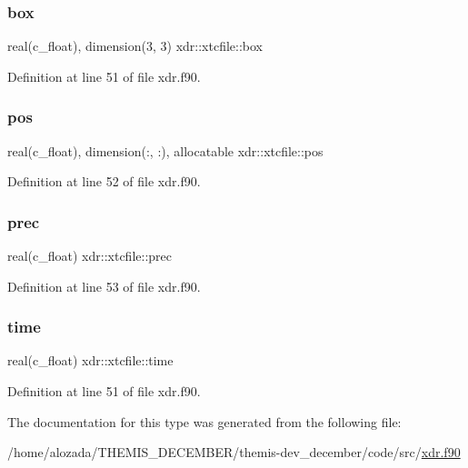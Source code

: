 \subsubsection{\texorpdfstring{box}{box}}
{\footnotesize\ttfamily real(c\+\_\+float), dimension(3, 3) xdr\+::xtcfile\+::box}



Definition at line 51 of file xdr.\+f90.

\mbox{\label{structxdr_1_1xtcfile_abda2627be95e0de9df18e915d53a988a}} 
\subsubsection{\texorpdfstring{pos}{pos}}
{\footnotesize\ttfamily real(c\+\_\+float), dimension(\+:, \+:), allocatable xdr\+::xtcfile\+::pos}



Definition at line 52 of file xdr.\+f90.

\mbox{\label{structxdr_1_1xtcfile_aac421da0ff0c236f762eb81f1b726c2f}} 
\subsubsection{\texorpdfstring{prec}{prec}}
{\footnotesize\ttfamily real(c\+\_\+float) xdr\+::xtcfile\+::prec}



Definition at line 53 of file xdr.\+f90.

\mbox{\label{structxdr_1_1xtcfile_a8bbfbd475a67d143c56584ec6adc5851}} 
\subsubsection{\texorpdfstring{time}{time}}
{\footnotesize\ttfamily real(c\+\_\+float) xdr\+::xtcfile\+::time}



Definition at line 51 of file xdr.\+f90.



The documentation for this type was generated from the following file\+:\begin{DoxyCompactItemize}
\item 
/home/alozada/\+T\+H\+E\+M\+I\+S\+\_\+\+D\+E\+C\+E\+M\+B\+E\+R/themis-\/dev\+\_\+december/code/src/\hyperlink{xdr_8f90}{xdr.\+f90}\end{DoxyCompactItemize}
